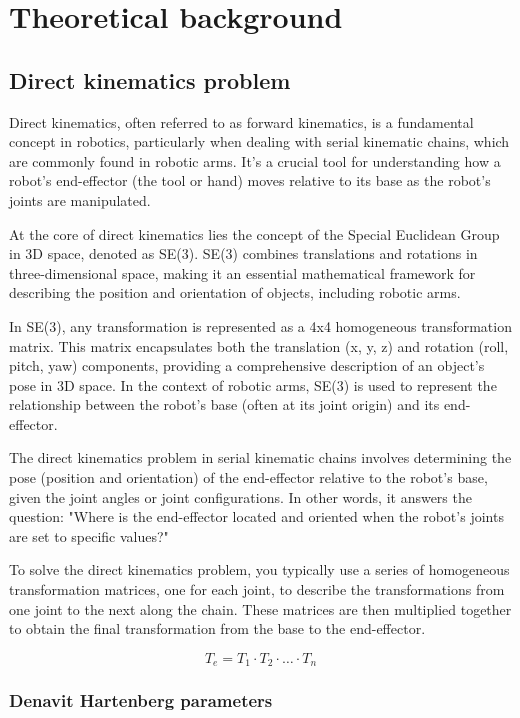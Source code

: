 \chapter{Theoretical background}\label{cap:background}

\section{Direct kinematics problem}

Direct kinematics, often referred to as forward kinematics, is a fundamental concept in robotics, particularly when dealing with serial kinematic chains, which are commonly found in robotic arms. It's a crucial tool for understanding how a robot's end-effector (the tool or hand) moves relative to its base as the robot's joints are manipulated.

At the core of direct kinematics lies the concept of the Special Euclidean Group in 3D space, denoted as SE(3). SE(3) combines translations and rotations in three-dimensional space, making it an essential mathematical framework for describing the position and orientation of objects, including robotic arms.

In SE(3), any transformation is represented as a 4x4 homogeneous transformation matrix. This matrix encapsulates both the translation (x, y, z) and rotation (roll, pitch, yaw) components, providing a comprehensive description of an object's pose in 3D space. In the context of robotic arms, SE(3) is used to represent the relationship between the robot's base (often at its joint origin) and its end-effector.

The direct kinematics problem in serial kinematic chains involves determining the pose (position and orientation) of the end-effector relative to the robot's base, given the joint angles or joint configurations. In other words, it answers the question: "Where is the end-effector located and oriented when the robot's joints are set to specific values?"

To solve the direct kinematics problem, you typically use a series of homogeneous transformation matrices, one for each joint, to describe the transformations from one joint to the next along the chain. These matrices are then multiplied together to obtain the final transformation from the base to the end-effector.

$$ T_e = T_1 \cdot T_2 \cdot \ldots \cdot T_n $$

\subsection{Denavit Hartenberg parameters}

